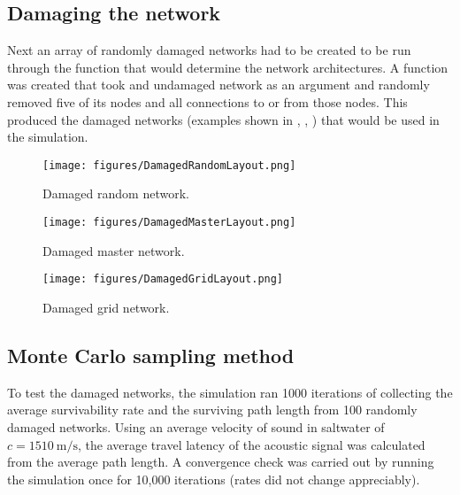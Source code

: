 \documentclass[twocolumn,10pt]{IEEEtran}
\begin{document}
\subsection{Damaging the network}
Next an array of randomly damaged networks had to be created to be run through the function that would determine the network architectures. A function was created that took and undamaged network as an argument and randomly removed five of its nodes and all connections to or from those nodes. This produced the damaged networks (examples shown in , , ) that would be used in the simulation.
\begin{figure}
\begin{center}
\texttt{[image: figures/DamagedRandomLayout.png]}
\end{center}
\caption{Damaged random network.}
\label{fig:damagerandom}
\end{figure}
\begin{figure}
\begin{center}
\texttt{[image: figures/DamagedMasterLayout.png]}
\end{center}
\caption{Damaged master network.}
\label{fig:damagecircular}
\end{figure}
\begin{figure}
\begin{center}
\texttt{[image: figures/DamagedGridLayout.png]}
\end{center}
\caption{Damaged grid network.}
\label{fig:damagegrid}
\end{figure}

\subsection{Monte Carlo sampling method}
To test the damaged networks, the simulation ran 1000 iterations of collecting the average survivability rate and the surviving path length from 100 randomly damaged networks. Using an average velocity of sound in saltwater of $c=\SI{1510}{\meter\per\second}$, the average travel latency of the acoustic signal was calculated from the average path length. A convergence check was carried out by running the simulation once for 10,000 iterations (rates did not change appreciably). 
\end{document}
